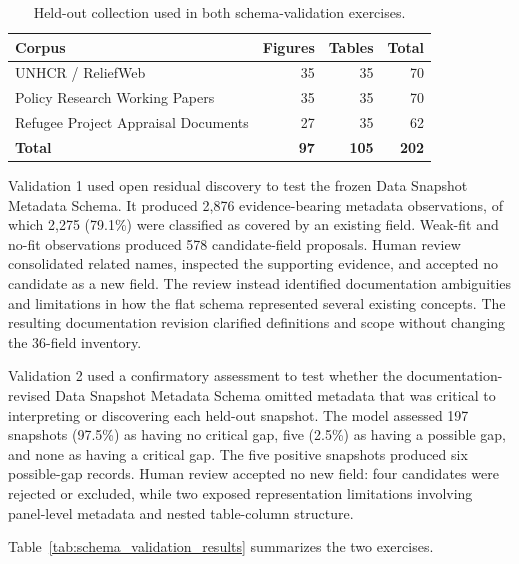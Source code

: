 \documentclass{article}
\begin{document}
\begin{table}[!ht]
    \centering
    \caption{Held-out collection used in both schema-validation exercises.}
    \label{tab:validation_composition}
    \begin{tabular}{lrrr}
        \toprule
        \textbf{Corpus} & \textbf{Figures} & \textbf{Tables} & \textbf{Total} \\
        \midrule
        UNHCR / ReliefWeb & 35 & 35 & 70 \\
        Policy Research Working Papers & 35 & 35 & 70 \\
        Refugee Project Appraisal Documents & 27 & 35 & 62 \\
        \midrule
        \textbf{Total} & \textbf{97} & \textbf{105} & \textbf{202} \\
        \bottomrule
    \end{tabular}
\end{table}

Validation 1 used open residual discovery to test the frozen Data Snapshot Metadata Schema. It produced 2,876 evidence-bearing metadata observations, of which 2,275 (79.1\%) were classified as covered by an existing field. Weak-fit and no-fit observations produced 578 candidate-field proposals. Human review consolidated related names, inspected the supporting evidence, and accepted no candidate as a new field. The review instead identified documentation ambiguities and limitations in how the flat schema represented several existing concepts. The resulting documentation revision clarified definitions and scope without changing the 36-field inventory.

Validation 2 used a confirmatory assessment to test whether the documentation-revised Data Snapshot Metadata Schema omitted metadata that was critical to interpreting or discovering each held-out snapshot. The model assessed 197 snapshots (97.5\%) as having no critical gap, five (2.5\%) as having a possible gap, and none as having a critical gap. The five positive snapshots produced six possible-gap records. Human review accepted no new field: four candidates were rejected or excluded, while two exposed representation limitations involving panel-level metadata and nested table-column structure.

Table~\ref{tab:schema_validation_results} summarizes the two exercises.
\end{document}
